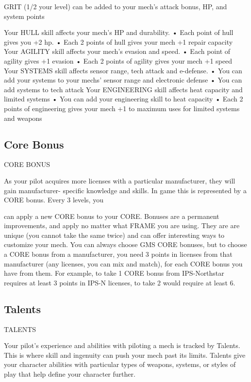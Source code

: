 GRIT (1/2 your level) can be added to your mech’s attack bonus, HP, and system points
 

Your HULL skill affects your mech’s HP and durability. 
       •  Each point of hull gives you +2 hp. 
       •  Each 2 points of hull gives your mech +1 repair capacity 
Your AGILITY skill affects your mech’s evasion and speed. 
       •  Each point of agility gives +1 evasion 
       •  Each 2 points of agility gives your mech +1 speed 
Your SYSTEMS skill affects sensor range, tech attack and e-defense. 
       •  You can add your systems to your mechs’ sensor range and electronic defense 
       •  You can add systems to tech attack 
Your ENGINEERING skill affects heat capacity and limited systems 
       •  You can add your engineering skill to heat capacity 
       •  Each 2 points of engineering gives your mech +1 to maximum uses for limited systems 
         and weapons 
\subsection{Core Bonus}
                                              CORE BONUS 

As your pilot acquires more licenses with a particular manufacturer, they will gain manufacturer- 
specific knowledge and skills. In game this is represented by a CORE bonus. Every 3 levels, you 

                                                                                                                 


can apply a new CORE bonus to your CORE. Bonuses are a permanent improvements, and  
apply no matter what FRAME you are using. They are are unique (you cannot take the same  
twice) and can offer interesting ways to customize your mech. You can always choose GMS  
CORE bonuses, but to choose a CORE bonus from a manufacturer, you need 3 points in licenses  
from that manufacturer (any licenses, you can mix and match), for each CORE bonus you have  
from them. For example, to take 1 CORE bonus from IPS-Northstar requires at least 3 points in  
IPS-N licenses, to take 2 would require at least 6.  

\subsection{Talents}
                                                 TALENTS  

Your pilot’s experience and abilities with piloting a mech is tracked by Talents. This is where skill  
and ingenuity can push your mech past its limits. Talents give your character abilities with  
particular types of weapons, systems, or styles of play that help define your character further.
 

